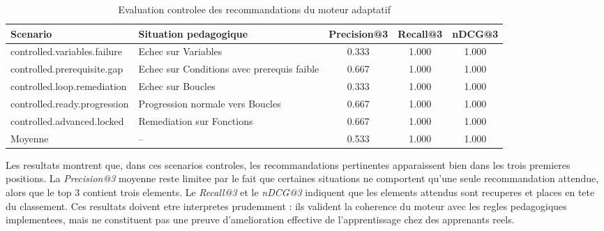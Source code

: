 \begin{table}[H]
\centering
\caption{Evaluation controlee des recommandations du moteur adaptatif}
\begin{tabular}{p{3.2cm}p{3.5cm}ccc}
\hline
Scenario & Situation pedagogique & Precision@3 & Recall@3 & nDCG@3 \\
\hline
controlled.variables.failure & Echec sur Variables & 0.333 & 1.000 & 1.000 \\
controlled.prerequisite.gap & Echec sur Conditions avec prerequis faible & 0.667 & 1.000 & 1.000 \\
controlled.loop.remediation & Echec sur Boucles & 0.333 & 1.000 & 1.000 \\
controlled.ready.progression & Progression normale vers Boucles & 0.667 & 1.000 & 1.000 \\
controlled.advanced.locked & Remediation sur Fonctions & 0.667 & 1.000 & 1.000 \\
\hline
Moyenne & -- & 0.533 & 1.000 & 1.000 \\
\hline
\end{tabular}
\end{table}

Les resultats montrent que, dans ces scenarios controles, les recommandations
pertinentes apparaissent bien dans les trois premieres positions. La
\textit{Precision@3} moyenne reste limitee par le fait que certaines situations
ne comportent qu'une seule recommandation attendue, alors que le top 3 contient
trois elements. Le \textit{Recall@3} et le \textit{nDCG@3} indiquent que les
elements attendus sont recuperes et places en tete du classement. Ces resultats
doivent etre interpretes prudemment : ils valident la coherence du moteur avec
les regles pedagogiques implementees, mais ne constituent pas une preuve
d'amelioration effective de l'apprentissage chez des apprenants reels.
